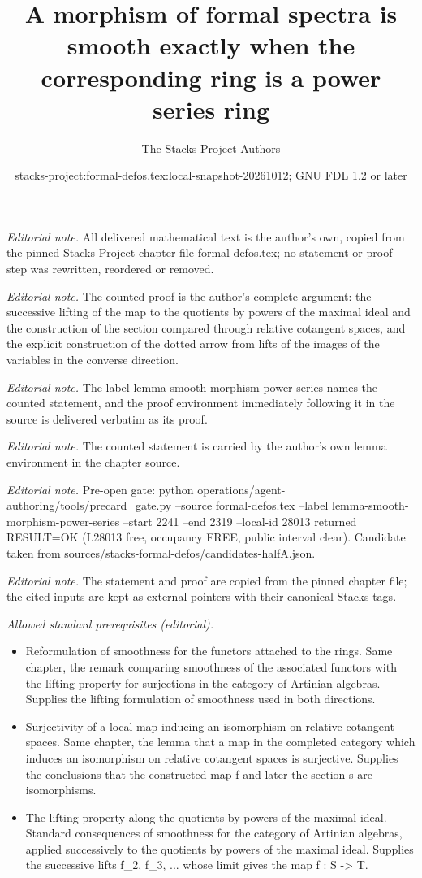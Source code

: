 \documentclass[10pt,a4paper]{amsart}
\title{A morphism of formal spectra is smooth exactly when the corresponding ring is a power series ring}
\author{The Stacks Project Authors}
\date{stacks-project:formal-defos.tex:local-snapshot-20261012; GNU FDL 1.2 or later}
\theoremstyle{plain}
\theoremstyle{definition}
\theoremstyle{remark}
\numberwithin{equation}{subsection}
\begin{document}
\maketitle
\noindent\textit{Editorial note.} All delivered mathematical text is the author's own, copied from the pinned Stacks Project chapter file formal-defos.tex; no statement or proof step was rewritten, reordered or removed.\par\medskip
\noindent\textit{Editorial note.} The counted proof is the author's complete argument: the successive lifting of the map to the quotients by powers of the maximal ideal and the construction of the section compared through relative cotangent spaces, and the explicit construction of the dotted arrow from lifts of the images of the variables in the converse direction.\par\medskip
\noindent\textit{Editorial note.} The label lemma-smooth-morphism-power-series names the counted statement, and the proof environment immediately following it in the source is delivered verbatim as its proof.\par\medskip
\noindent\textit{Editorial note.} The counted statement is carried by the author's own lemma environment in the chapter source.\par\medskip
\noindent\textit{Editorial note.} Pre-open gate: python operations/agent-authoring/tools/precard\_gate.py --source formal-defos.tex --label lemma-smooth-morphism-power-series --start 2241 --end 2319 --local-id 28013 returned RESULT=OK (L28013 free, occupancy FREE, public interval clear). Candidate taken from sources/stacks-formal-defos/candidates-halfA.json.\par\medskip
\noindent\textit{Editorial note.} The statement and proof are copied from the pinned chapter file; the cited inputs are kept as external pointers with their canonical Stacks tags.\par\medskip
\noindent\textit{Allowed standard prerequisites (editorial).}\begin{itemize}
\item Reformulation of smoothness for the functors attached to the rings. Same chapter, the remark comparing smoothness of the associated functors with the lifting property for surjections in the category of Artinian algebras. Supplies the lifting formulation of smoothness used in both directions.
\item Surjectivity of a local map inducing an isomorphism on relative cotangent spaces. Same chapter, the lemma that a map in the completed category which induces an isomorphism on relative cotangent spaces is surjective. Supplies the conclusions that the constructed map f and later the section s are isomorphisms.
\item The lifting property along the quotients by powers of the maximal ideal. Standard consequences of smoothness for the category of Artinian algebras, applied successively to the quotients by powers of the maximal ideal. Supplies the successive lifts f\_2, f\_3, ... whose limit gives the map f : S -> T.
\end{itemize}\medskip
\end{document}
